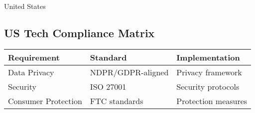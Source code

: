 \begin{regionalbox}{United States}
\subsection{US Tech Compliance Matrix}\label{subsec:us-tech-compliance-matrix}
\begin{center}
\begin{tabularx}{\textwidth}{>{\raggedright\arraybackslash}X >{\centering\arraybackslash}X >{\raggedright\arraybackslash}X}
    \toprule
    \textbf{Requirement} & \textbf{Standard} & \textbf{Implementation} \\
    \midrule
    Data Privacy & NDPR/GDPR-aligned & Privacy framework \\
    Security & ISO 27001 & Security protocols \\
    Consumer Protection & FTC standards & Protection measures \\
    \bottomrule
\end{tabularx}
\end{center}
\end{regionalbox}

